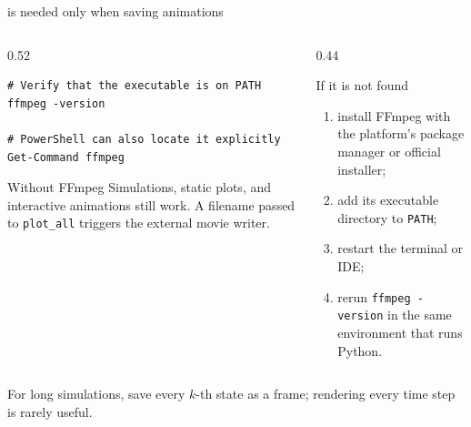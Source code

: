 \documentclass[aspectratio=169,11pt]{beamer}
\begin{document}
\begin{frame}[fragile]{ is needed only when saving animations}
\begin{columns}[T,onlytextwidth]
\begin{column}{0.52\textwidth}
\begin{lstlisting}
# Verify that the executable is on PATH
ffmpeg -version

# PowerShell can also locate it explicitly
Get-Command ffmpeg
\end{lstlisting}
\begin{block}{Without FFmpeg}
Simulations, static plots, and interactive animations still work. A filename passed to \texttt{plot\_all} triggers the external movie writer.
\end{block}
\end{column}
\begin{column}{0.44\textwidth}
\begin{alertblock}{If it is not found}
\begin{enumerate}\itemsep4pt
  \item install FFmpeg with the platform's package manager or official installer;
  \item add its executable directory to \texttt{PATH};
  \item restart the terminal or IDE;
  \item rerun \texttt{ffmpeg -version} in the same environment that runs Python.
\end{enumerate}
\end{alertblock}
\end{column}
\end{columns}
\begin{punchbox}
\centering
For long simulations, save every \(k\)-th state as a frame; rendering every time step is rarely useful.
\end{punchbox}
\end{frame}
\end{document}
